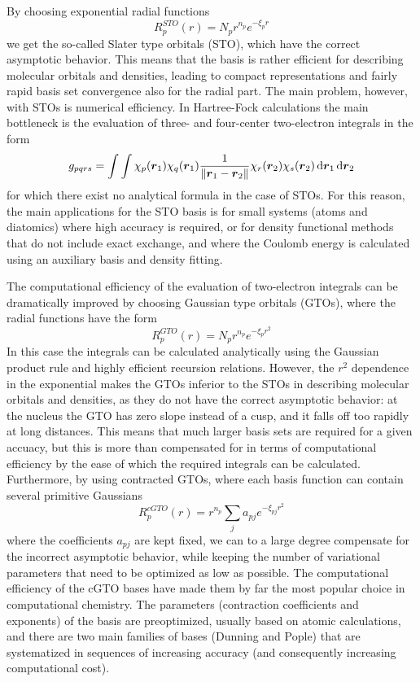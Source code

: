 By choosing exponential radial functions
\begin{equation}
    R_p^{STO}(r) = N_pr^{n_p}e^{-\xi_p r}
\end{equation}
we get the so-called Slater type orbitals (STO), which have the correct asymptotic behavior. This
means that the basis is rather efficient for describing molecular orbitals and densities, leading
to compact representations and fairly rapid basis set convergence also for the radial part.
The main problem, however, with STOs is numerical efficiency. In Hartree-Fock calculations the
main bottleneck is the evaluation of three- and four-center two-electron integrals in the form
\begin{equation}
    g_{pqrs} = \int\int \chi_p(\boldsymbol r_1)\chi_q(\boldsymbol r_1)\frac{1}{\|\boldsymbol r_1-\boldsymbol r_2\|}
	\chi_r(\boldsymbol r_2)\chi_s(\boldsymbol r_2) \,\mathrm{d}\boldsymbol r_1\,\mathrm{d}\boldsymbol r_2
\end{equation}
for which there exist no analytical formula in the case of STOs. For this reason, the main
applications for the STO basis is for small systems (atoms and diatomics) where high accuracy
is required, or for density functional methods that do not include exact exchange, and where 
the Coulomb energy is calculated using an auxiliary basis and density fitting\cite{dens_fit}.

The computational efficiency of the evaluation of two-electron integrals can be dramatically 
improved by choosing Gaussian type orbitals (GTOs), where the radial functions have the form
\begin{equation}
    R_p^{GTO}(r) = N_pr^{n_p}e^{-\xi_p r^2}
\end{equation}
In this case the integrals can be calculated analytically using the Gaussian product rule and
highly efficient recursion relations\cite{something}. However, the $r^2$ dependence in the 
exponential makes the GTOs inferior to the STOs in describing molecular orbitals and densities,
as they do not have the correct asymptotic behavior: at the nucleus the GTO has zero slope instead
of a cusp, and it falls off too rapidly at long distances. This means that much larger basis sets
are required for a given accuacy, but this is more than compensated for in terms of computational
efficiency by the ease of which the required integrals can be calculated. Furthermore, by using
contracted GTOs, where each basis function can contain several primitive Gaussians
\begin{equation}
    R_p^{cGTO}(r) = r^{n_p}\sum_ja_{pj}e^{-\xi_{pj} r^2}
\end{equation}
where the coefficients $a_{pj}$ are kept fixed, we can to a large degree compensate for the incorrect
asymptotic behavior, while keeping the number of variational parameters that need to be optimized as
low as possible. The computational efficiency of the cGTO bases have made them by far the most
popular choice in computational chemistry. The parameters (contraction coefficients and exponents)
of the basis are preoptimized, usually based on atomic calculations, and there are two main
families of bases (Dunning\cite{dunning} and Pople\cite{pople}) that are systematized in sequences
of increasing accuracy (and consequently increasing computational cost). 

